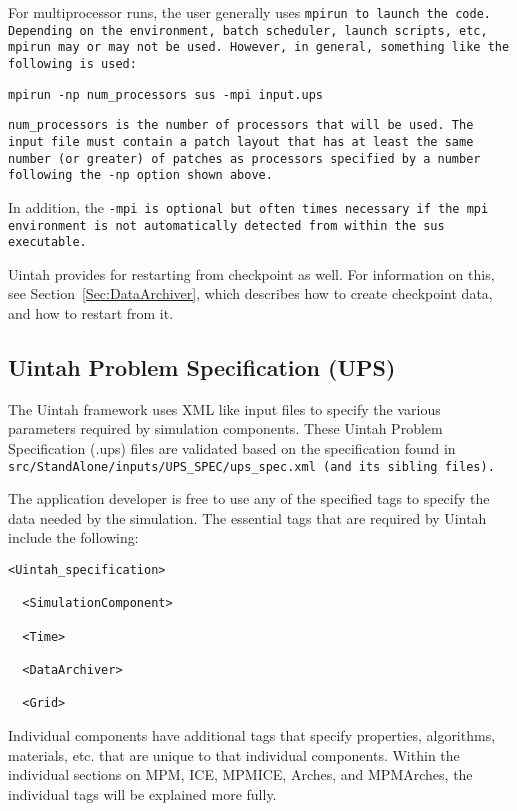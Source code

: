For multiprocessor runs, the user generally uses \tt mpirun
\normalfont to launch the code.  Depending on the environment, batch
scheduler, launch scripts, etc, \tt mpirun \normalfont may or may not
be used.  However, in general, something like the following is used:
\begin{Verbatim}[fontsize=\footnotesize]
  mpirun -np num_processors sus -mpi input.ups
\end{Verbatim}

\tt num\_processors \normalfont is the number of processors that will
be used.  The input file must contain a patch layout that has at least
the same number (or greater) of patches as processors specified by a
number following the -np option shown above.

In addition, the \tt -mpi \normalfont is optional but often times
necessary if the mpi environment is not automatically detected from
within the sus executable.

Uintah provides for restarting from checkpoint as well.  For information on
this, see Section~\ref{Sec:DataArchiver}, which describes how to create
checkpoint data, and how to restart from it.

\subsection{Uintah Problem Specification (UPS)} \label{Sec:UPS}

The Uintah framework uses XML like input files to specify the various
parameters required by simulation components.  These Uintah Problem
Specification (.ups) files are validated based on the specification
found in \tt src/StandAlone/inputs/UPS\_SPEC/ups\_spec.xml \normalfont
(and its sibling files).  

The application developer is free to use any of the specified tags to
specify the data needed by the simulation.  The essential tags that
are required by Uintah include the following:

\begin{Verbatim}[fontsize=\footnotesize]
  <Uintah_specification>

  <SimulationComponent>

  <Time>

  <DataArchiver>

  <Grid>
\end{Verbatim}


Individual components have additional tags that specify properties,
algorithms, materials, etc. that are unique to that individual
components.  Within the individual sections on MPM, ICE, MPMICE,
Arches, and MPMArches, the individual tags will be explained more
fully.

